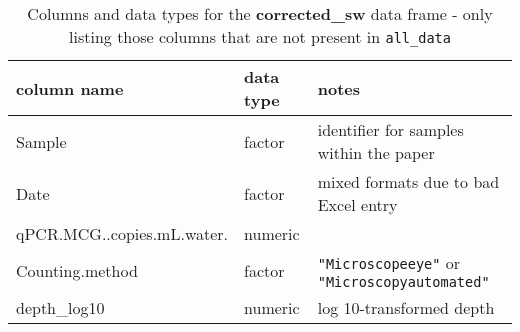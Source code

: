 \documentclass{article}
\begin{document}
\begin{longtable}{lll}%
\caption{Columns and data types for the \textbf{corrected\_sw} data frame - only listing those columns that are not present in \texttt{all\_data} } \\
\hline
column name & data type & notes \\ \hline
Sample & factor & identifier for samples within the paper\\ 
Date & factor & mixed formats due to bad Excel entry \\
qPCR.MCG..copies.mL.water. & numeric & \\
Counting.method & factor & \texttt{"Microscope\-eye"} or \texttt{"Microscopy\-automated"}\\
depth\_log10 & numeric & log 10-transformed depth\\
\hline
\end{longtable}
\end{document}
